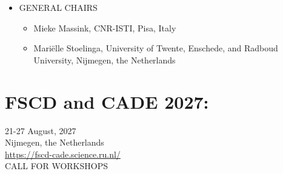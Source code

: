 \documentclass[prodmode,acmtecs]{acmsmall} %
\begin{document}
\begin{itemize}
  The proceedings of FSEN'27 will be published by Springer in the LNCS series. Following the tradition of FSEN, we plan to have a special issue of the Science of Computer Programming journal devoted to FSEN'27. After the conference a selection of papers will be invited for this special issue. The invited papers should be revised and extended and will undergo a new round of review by an international program committee. Please see the websites of previous editions of FSEN for more information on proceedings and special issues related to those editions. 
 
\item  GENERAL CHAIRS  
 
\begin{itemize}\item  Mieke Massink, CNR-ISTI, Pisa, Italy
\item  Mariëlle Stoelinga, University of Twente, Enschede, and Radboud University, Nijmegen, the Netherlands
\end{itemize} 
\end{itemize}\section{FSCD and CADE 2027: }\label{FSCDandCADE2027}  21-27 August, 2027\\ 
  Nijmegen, the Netherlands\\ 
  \href{https://fscd-cade.science.ru.nl/}{https://fscd-cade.science.ru.nl/}\\ 
CALL FOR WORKSHOPS  
\end{document}
